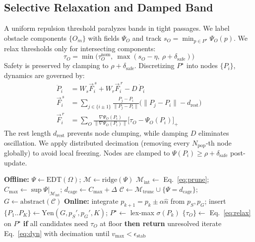 \documentclass[conference]{IEEEtran}
\begin{document}
\subsection{Selective Relaxation and Damped Band}

A uniform repulsion threshold paralyzes bands in tight passages. We label obstacle components $\{O_m\}$ with fields $\Psi_O$ and track $s_O=\min_{p\in P^\star}\Psi_O(p)$. We relax thresholds only for intersecting components:
\begin{equation}
\tau_O=\min\big(\tau_O^{\mathrm{nom}},\ \max(s_O-\eta,\ \rho+\delta_{\mathrm{safe}})\big)
\label{eq:relax}
\end{equation}
Safety is preserved by clamping to $\rho+\delta_{\mathrm{safe}}$. Discretizing $P^\star$ into nodes $\{P_i\}$, dynamics are governed by:
\begin{align}
\ddot{P}_i &= W_s \vec{F}^{\,s}_i + W_r \vec{F}^{\,r}_i - D\,\dot{P}_i \label{eq:dyn} \\
\vec{F}^{\,s}_i &= \sum_{j\in\{i\pm1\}}\frac{P_j-P_i}{\|P_j-P_i\|}\big(\|P_j-P_i\|-d_{\mathrm{rest}}\big) \nonumber \\
\vec{F}^{\,r}_i &= \sum_{O} \frac{\nabla\Psi_O(P_i)}{\|\nabla\Psi_O(P_i)\|}\big[\tau_O-\Psi_O(P_i)\big]_+ \nonumber
\end{align}
The rest length $d_{\mathrm{rest}}$ prevents node clumping, while damping $D$ eliminates oscillation. We apply distributed decimation (removing every $N_{\mathrm{pop}}$-th node globally) to avoid local freezing. Nodes are clamped to $\Psi(P_i)\ge\rho+\delta_{\mathrm{safe}}$ post-update.

\begin{algorithm}[htbp]
\caption{Topological Cage query}
\label{alg:query}
\begin{algorithmic}[1]
\STATE \textbf{Offline:} $\Psi\!\leftarrow\!\mathrm{EDT}(\Omega)$; $\mathcal{M}\!\leftarrow\!\mathrm{ridge}(\Psi)$
\STATE $\mathcal{M}_{\mathrm{int}}\!\leftarrow\!$ Eq.~\eqref{eq:prune}; $C_{\max}\!\leftarrow\!\sup\Psi|_{\mathcal{M}_{\mathrm{int}}}$; $d_{\mathrm{cage}}\!\leftarrow\!C_{\max}\!+\!\Delta$
\STATE $\mathcal{C}\!\leftarrow\!\mathcal{M}_{\mathrm{trunc}}\cup\{\Psi\!=\!d_{\mathrm{cage}}\}$; $G\!\leftarrow\!\mathrm{abstract}(\mathcal{C})$
\STATE \textbf{Online:} integrate $p_{k+1}=p_k\pm\alpha\hat{n}$ from $p_S,p_G$; insert
\STATE $\{P_1..P_K\}\leftarrow\mathrm{Yen}(G,p_S',p_G',K)$; $P^\star\leftarrow$ lex-max $\sigma(P_k)$
\STATE $\{\tau_O\}\leftarrow$ Eq.~\eqref{eq:relax} on $P^\star$
\STATE \textbf{if} all candidates need $\tau_O$ at floor \textbf{then return} unresolved
\STATE iterate Eq.~\eqref{eq:dyn} with decimation until $v_{\max}<\epsilon_{\mathrm{stab}}$
\end{algorithmic}
\end{algorithm}
\end{document}
